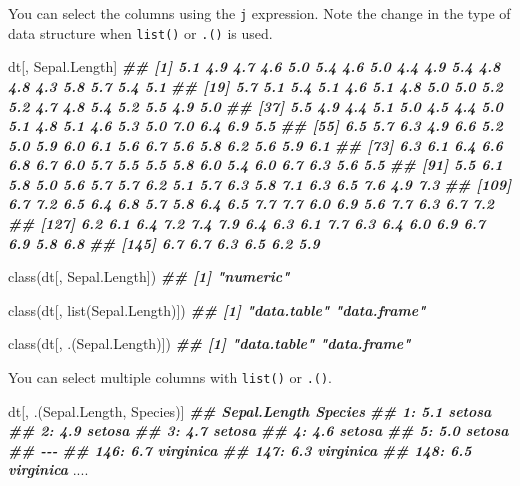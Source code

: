 \documentclass[
]{book}
\newenvironment{Shaded}{\begin{snugshade}}{\end{snugshade}}
\newcommand{\DocumentationTok}[1]{\textcolor[rgb]{0.56,0.35,0.01}{\textbf{\textit{#1}}}}
\newcommand{\FunctionTok}[1]{\textcolor[rgb]{0.00,0.00,0.00}{#1}}
\newcommand{\NormalTok}[1]{#1}
\begin{document}
You can select the columns using the \texttt{j} expression. Note the change in the type of data structure when \texttt{list()} or \texttt{.()} is used.

\begin{Shaded}
\begin{Highlighting}[]
\NormalTok{dt[, Sepal.Length]}
\DocumentationTok{\#\#   [1] 5.1 4.9 4.7 4.6 5.0 5.4 4.6 5.0 4.4 4.9 5.4 4.8 4.8 4.3 5.8 5.7 5.4 5.1}
\DocumentationTok{\#\#  [19] 5.7 5.1 5.4 5.1 4.6 5.1 4.8 5.0 5.0 5.2 5.2 4.7 4.8 5.4 5.2 5.5 4.9 5.0}
\DocumentationTok{\#\#  [37] 5.5 4.9 4.4 5.1 5.0 4.5 4.4 5.0 5.1 4.8 5.1 4.6 5.3 5.0 7.0 6.4 6.9 5.5}
\DocumentationTok{\#\#  [55] 6.5 5.7 6.3 4.9 6.6 5.2 5.0 5.9 6.0 6.1 5.6 6.7 5.6 5.8 6.2 5.6 5.9 6.1}
\DocumentationTok{\#\#  [73] 6.3 6.1 6.4 6.6 6.8 6.7 6.0 5.7 5.5 5.5 5.8 6.0 5.4 6.0 6.7 6.3 5.6 5.5}
\DocumentationTok{\#\#  [91] 5.5 6.1 5.8 5.0 5.6 5.7 5.7 6.2 5.1 5.7 6.3 5.8 7.1 6.3 6.5 7.6 4.9 7.3}
\DocumentationTok{\#\# [109] 6.7 7.2 6.5 6.4 6.8 5.7 5.8 6.4 6.5 7.7 7.7 6.0 6.9 5.6 7.7 6.3 6.7 7.2}
\DocumentationTok{\#\# [127] 6.2 6.1 6.4 7.2 7.4 7.9 6.4 6.3 6.1 7.7 6.3 6.4 6.0 6.9 6.7 6.9 5.8 6.8}
\DocumentationTok{\#\# [145] 6.7 6.7 6.3 6.5 6.2 5.9}

\FunctionTok{class}\NormalTok{(dt[, Sepal.Length])}
\DocumentationTok{\#\# [1] "numeric"}

\FunctionTok{class}\NormalTok{(dt[, }\FunctionTok{list}\NormalTok{(Sepal.Length)])}
\DocumentationTok{\#\# [1] "data.table" "data.frame"}

\FunctionTok{class}\NormalTok{(dt[, .(Sepal.Length)])}
\DocumentationTok{\#\# [1] "data.table" "data.frame"}
\end{Highlighting}
\end{Shaded}

You can select multiple columns with \texttt{list()} or \texttt{.()}.

\begin{Shaded}
\begin{Highlighting}[]

\NormalTok{dt[, .(Sepal.Length, Species)]}
\DocumentationTok{\#\#      Sepal.Length   Species}
\DocumentationTok{\#\#   1:          5.1    setosa}
\DocumentationTok{\#\#   2:          4.9    setosa}
\DocumentationTok{\#\#   3:          4.7    setosa}
\DocumentationTok{\#\#   4:          4.6    setosa}
\DocumentationTok{\#\#   5:          5.0    setosa}
\DocumentationTok{\#\#  {-}{-}{-}                       }
\DocumentationTok{\#\# 146:          6.7 virginica}
\DocumentationTok{\#\# 147:          6.3 virginica}
\DocumentationTok{\#\# 148:          6.5 virginica}
\NormalTok{....}
\end{Highlighting}
\end{Shaded}
\end{document}
